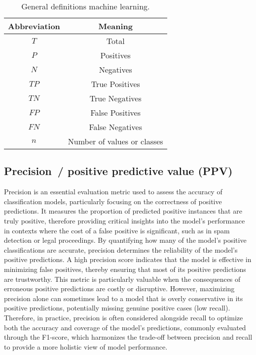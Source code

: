 \documentclass{article}
\begin{document}
\begin{table}[H]
    \centering

    \begin{tabular}{|c|c|}
        \hline
        Abbreviation & Meaning \\
        \hline
        \hline
        $\textit{T}$  & Total                       \\
        $\textit{P}$  & Positives                   \\
        $\textit{N}$  & Negatives                   \\
        $\textit{TP}$ & True Positives              \\
        $\textit{TN}$ & True Negatives              \\
        $\textit{FP}$ & False Positives             \\
        $\textit{FN}$ & False Negatives             \\
        $n$           & Number of values or classes \\
        \hline
    \end{tabular}

    \caption{General definitions machine learning.}
    \label{table:ML_general}
\end{table}


\subsection[Precision~/ positive predictive value (PPV)]{Precision~/ positive predictive value (PPV) \cite{altman1994statistics, fletcher2019clinical}}

Precision \cite{altman1994statistics, fletcher2019clinical} is an essential evaluation metric used to assess the accuracy of classification models, particularly focusing on the correctness of positive predictions. It measures the proportion of predicted positive instances that are truly positive, therefore providing critical insights into the model's performance in contexts where the cost of a false positive is significant, such as in spam detection or legal proceedings. By quantifying how many of the model's positive classifications are accurate, precision determines the reliability of the model's positive predictions. A high precision score indicates that the model is effective in minimizing false positives, thereby ensuring that most of its positive predictions are trustworthy. This metric is particularly valuable when the consequences of erroneous positive predictions are costly or disruptive. However, maximizing precision alone can sometimes lead to a model that is overly conservative in its positive predictions, potentially missing genuine positive cases (low recall). Therefore, in practice, precision is often considered alongside recall to optimize both the accuracy and coverage of the model's predictions, commonly evaluated through the F1-score, which harmonizes the trade-off between precision and recall to provide a more holistic view of model performance.
\end{document}
